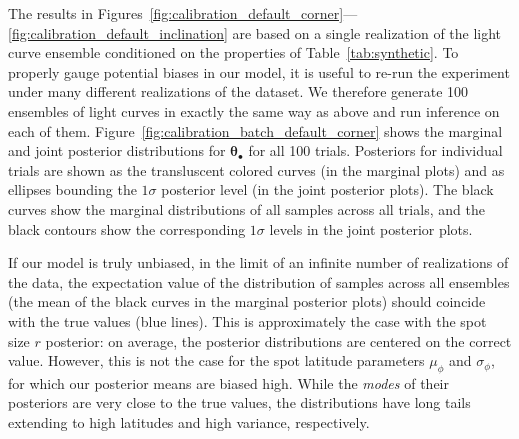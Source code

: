 \documentclass[modern]{aastex62}
\begin{document}
The results in
Figures~\ref{fig:calibration_default_corner}---\ref{fig:calibration_default_inclination}
are based on a single realization of the light curve ensemble conditioned on
the properties of Table~\ref{tab:synthetic}. To properly gauge potential biases
in our model, it is useful to re-run the experiment under many different realizations
of the dataset. We therefore generate 100 ensembles of light curves in
exactly the same way as above and run inference on each of them.
Figure~\ref{fig:calibration_batch_default_corner} shows the marginal and joint
posterior distributions for $\pmb{\theta}_\bullet$ for all 100 trials.
Posteriors for individual trials are shown as the transluscent colored curves
(in the marginal plots) and as ellipses bounding the $1\sigma$ posterior level
(in the joint posterior plots). The black curves show the marginal distributions of all
samples across all trials, and the black contours show the corresponding $1\sigma$
levels in the joint posterior plots.

If our model is truly unbiased, in the limit of an infinite number of realizations
of the data, the expectation value of the distribution
of samples across all ensembles (the mean of the black curves in the marginal
posterior plots) should coincide with the true values (blue lines).
This is approximately
the case with the spot size $r$ posterior: on average, the posterior
distributions are centered on the correct value.
However, this is not the case for
the spot latitude parameters $\mu_\phi$ and $\sigma_\phi$, for which our
posterior means are biased high. While the \emph{modes} of their
posteriors are very close to the true values, the distributions have long
tails extending to high latitudes and high variance, respectively.
\end{document}
